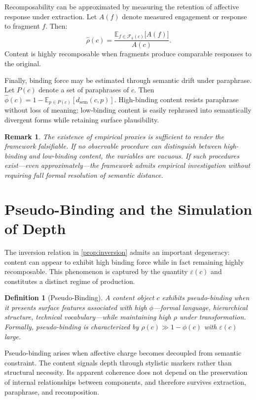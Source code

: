 \documentclass[12pt]{article}
\newtheorem{definition}{Definition}[section]
\newtheorem{remark}{Remark}[section]
\newcommand{\bind}{\phi}
\newcommand{\recomp}{\rho}
\newcommand{\dsem}{d_{\mathrm{sem}}}
\begin{document}
Recomposability can be approximated by measuring the retention of
affective response under extraction. Let $A(f)$ denote measured
engagement or response to fragment $f$. Then:
\[
\widehat{\recomp}(c) =
\frac{\mathbb{E}_{f \in \mathcal{F}_k(c)}\bigl[A(f)\bigr]}{A(c)}.
\]
Content is highly recomposable when fragments produce comparable
responses to the original.

Finally, binding force may be estimated through semantic drift under
paraphrase. Let $P(c)$ denote a set of paraphrases of $c$. Then
$\widehat{\bind}(c) = 1 - \mathbb{E}_{p \in P(c)}[\dsem(c, p)]$.
High-binding content resists paraphrase without loss of meaning;
low-binding content is easily rephrased into semantically divergent
forms while retaining surface plausibility.

\begin{remark}
The existence of empirical proxies is sufficient to render the framework
falsifiable. If no observable procedure can distinguish between
high-binding and low-binding content, the variables are vacuous. If such
procedures exist---even approximately---the framework admits empirical
investigation without requiring full formal resolution of semantic
distance.
\end{remark}

\section{Pseudo-Binding and the Simulation of Depth}
\label{sec:pseudobinding}

The inversion relation in \cref{prop:inversion} admits an important
degeneracy: content can appear to exhibit high binding force while in
fact remaining highly recomposable. This phenomenon is captured by the
quantity $\varepsilon(c)$ and constitutes a distinct regime of
production.

\begin{definition}[Pseudo-Binding]
\label{def:pseudobinding}
A content object $c$ exhibits \emph{pseudo-binding} when it presents
surface features associated with high $\bind$---formal language,
hierarchical structure, technical vocabulary---while maintaining high
$\recomp$ under transformation. Formally, pseudo-binding is
characterized by $\recomp(c) \gg 1 - \bind(c)$ with $\varepsilon(c)$
large.
\end{definition}

Pseudo-binding arises when affective charge becomes decoupled from
semantic constraint. The content signals depth through stylistic markers
rather than structural necessity. Its apparent coherence does not depend
on the preservation of internal relationships between components, and
therefore survives extraction, paraphrase, and recomposition.
\end{document}
